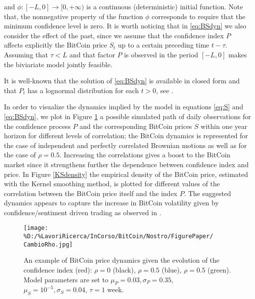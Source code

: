 \documentclass[12pt,centertags,reqno]{amsart}
\numberwithin{equation}{section} \makeatletter
\def \F {\mathcal F}
\def \R {\mathbb R}
\begin{document}
and $\phi:[-L,0] \to [0,+\infty)$ is a continuous (deterministic) initial function. Note that, the nonnegative property of the function $\phi$ corresponds to require that the minimum confidence level is zero.
It is worth noticing that in \eqref{eq:BSdyn} we also consider the effect of the past, since we assume that the confidence index $P$ affects explicitly the BitCoin price $S_t$ up to a certain preceding time $t-\tau$. Assuming that $\tau<L$ and that factor $P$ is observed in the period $[-L,0]$ makes the biviariate model jointly feasible.

It is well-known that the solution of \eqref{eq:BSdyn} is available in closed form and that $P_t$ has a lognormal distribution for each $t > 0$, see \citet{black1973pricing}. 


In order to visualize the dynamics implied by the model in equations \eqref{eq:S} and \eqref{eq:BSdyn}, we plot in Figure \ref{CambioRho} a possible simulated path of daily observations for the confidence process $P$ and the corresponding BitCoin prices $S$ within one year horizon for different levels of correlation; the BitCoin dynamics is represented for the case of independent and perfectly correlated Brownian motions as well as for the case of $\rho=0.5$.
Increasing the correlations gives a boost to the BitCoin market since it strengthens further the dependence between confidence index and price. In Figure \ref{KSdensity} the empirical density of the BitCoin price, estimated with the Kernel smoothing method, is plotted for different values of the correlation between the BitCoin price itself and the index $P$. The suggested dynamics appears to capture the increase in BitCoin volatility given by confidence/sentiment driven trading as observed in \citet{GoogleTrends, bukovina2016sentiment}. 

\begin{figure}[htbp]
\texttt{[image: \%D:/\%LavoriRicerca/InCorso/BitCoin/Nostro/FigurePaper/
CambioRho.jpg]}
\caption{An example of BitCoin price dynamics given the evolution of the confidence index (red): $\rho=0$ (black), $\rho=0.5$ (blue), $\rho=0.5$  (green).
Model parameters are set to $\mu_P=0.03,\sigma_P=0.35$, $\mu_S=10^{-5},\sigma_S=0.04$, $\tau=1$ week.} \label{CambioRho}
\end{figure}
\end{document}
